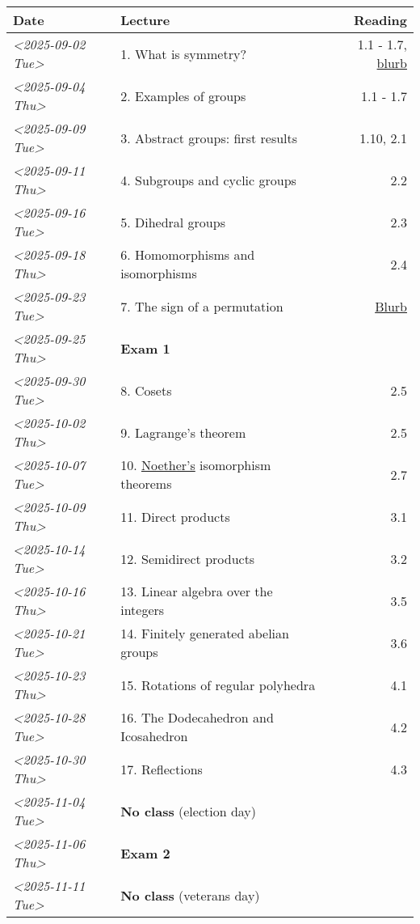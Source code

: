 \documentclass[11pt]{article}
\begin{document}
\begin{center}
\begin{tabular}{l|l|r}
\hline
Date & Lecture & Reading\\[0pt]
\hline
\textit{<2025-09-02 Tue>} & 1. What is symmetry? & 1.1 - 1.7, \href{https://kconrad.math.uconn.edu/blurbs/grouptheory/whygroups.pdf}{blurb}\\[0pt]
\textit{<2025-09-04 Thu>} & 2. Examples of groups & 1.1 - 1.7\\[0pt]
\textit{<2025-09-09 Tue>} & 3. Abstract groups: first results & 1.10, 2.1\\[0pt]
\textit{<2025-09-11 Thu>} & 4. Subgroups and cyclic groups & 2.2\\[0pt]
\textit{<2025-09-16 Tue>} & 5. Dihedral groups & 2.3\\[0pt]
\textit{<2025-09-18 Thu>} & 6. Homomorphisms and isomorphisms & 2.4\\[0pt]
\textit{<2025-09-23 Tue>} & 7. The sign of a permutation & \href{https://kconrad.math.uconn.edu/blurbs/grouptheory/sign.pdf}{Blurb}\\[0pt]
\textit{<2025-09-25 Thu>} & \textbf{Exam 1} & \\[0pt]
\textit{<2025-09-30 Tue>} & 8. Cosets & 2.5\\[0pt]
\textit{<2025-10-02 Thu>} & 9. Lagrange's theorem & 2.5\\[0pt]
\textit{<2025-10-07 Tue>} & 10. \href{https://en.wikipedia.org/wiki/Emmy\_Noether}{Noether's} isomorphism theorems & 2.7\\[0pt]
\textit{<2025-10-09 Thu>} & 11. Direct products & 3.1\\[0pt]
\textit{<2025-10-14 Tue>} & 12. Semidirect products & 3.2\\[0pt]
\textit{<2025-10-16 Thu>} & 13. Linear algebra over the integers & 3.5\\[0pt]
\textit{<2025-10-21 Tue>} & 14. Finitely generated abelian groups & 3.6\\[0pt]
\textit{<2025-10-23 Thu>} & 15. Rotations of regular polyhedra & 4.1\\[0pt]
\textit{<2025-10-28 Tue>} & 16. The Dodecahedron and Icosahedron & 4.2\\[0pt]
\textit{<2025-10-30 Thu>} & 17. Reflections & 4.3\\[0pt]
\textit{<2025-11-04 Tue>} & \textbf{No class} (election day) & \\[0pt]
\textit{<2025-11-06 Thu>} & \textbf{Exam 2} & \\[0pt]
\textit{<2025-11-11 Tue>} & \textbf{No class} (veterans day) & \\[0pt]

\end{tabular}
\end{center}
\end{document}
